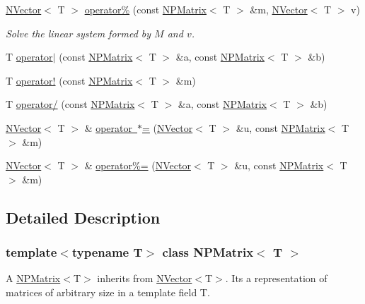 \begin{DoxyCompactItemize}
\mbox{\hyperlink{class_n_vector}{N\+Vector}}$<$ T $>$ \mbox{\hyperlink{class_n_p_matrix_a15e021ffe286b766ab68b83a6e70d891}{operator\%}} (const \mbox{\hyperlink{class_n_p_matrix}{N\+P\+Matrix}}$<$ T $>$ \&m, \mbox{\hyperlink{class_n_vector}{N\+Vector}}$<$ T $>$ v)
\begin{DoxyCompactList}\small\item\em Solve the linear system formed by $ M $ and $ v $. \end{DoxyCompactList}\item 
T \mbox{\hyperlink{class_n_p_matrix_a89e68801a92b42dbb69eb67a4c4cf0da}{operator$\vert$}} (const \mbox{\hyperlink{class_n_p_matrix}{N\+P\+Matrix}}$<$ T $>$ \&a, const \mbox{\hyperlink{class_n_p_matrix}{N\+P\+Matrix}}$<$ T $>$ \&b)
\item 
T \mbox{\hyperlink{class_n_p_matrix_a0f6cfdff016d49df6c2dbb79e85b9842}{operator!}} (const \mbox{\hyperlink{class_n_p_matrix}{N\+P\+Matrix}}$<$ T $>$ \&m)
\item 
T \mbox{\hyperlink{class_n_p_matrix_a12aeb8ceae55cbd9937701cb056b113b}{operator/}} (const \mbox{\hyperlink{class_n_p_matrix}{N\+P\+Matrix}}$<$ T $>$ \&a, const \mbox{\hyperlink{class_n_p_matrix}{N\+P\+Matrix}}$<$ T $>$ \&b)
\item 
\mbox{\hyperlink{class_n_vector}{N\+Vector}}$<$ T $>$ \& \mbox{\hyperlink{class_n_p_matrix_a3ac1836124d15848447935dd5ab657eb}{operator $\ast$=}} (\mbox{\hyperlink{class_n_vector}{N\+Vector}}$<$ T $>$ \&u, const \mbox{\hyperlink{class_n_p_matrix}{N\+P\+Matrix}}$<$ T $>$ \&m)
\item 
\mbox{\hyperlink{class_n_vector}{N\+Vector}}$<$ T $>$ \& \mbox{\hyperlink{class_n_p_matrix_a4eb92336cc8c489af26d55dd36bd7e90}{operator\%=}} (\mbox{\hyperlink{class_n_vector}{N\+Vector}}$<$ T $>$ \&u, const \mbox{\hyperlink{class_n_p_matrix}{N\+P\+Matrix}}$<$ T $>$ \&m)
\end{DoxyCompactItemize}


\subsection{Detailed Description}
\subsubsection*{template$<$typename T$>$\newline
class N\+P\+Matrix$<$ T $>$}

A {\ttfamily \mbox{\hyperlink{class_n_p_matrix}{N\+P\+Matrix}}$<$T$>$} inherits from {\ttfamily \mbox{\hyperlink{class_n_vector}{N\+Vector}}$<$T$>$}. It\textquotesingle{}s a representation of matrices of arbitrary size in a template field {\ttfamily T}. 


